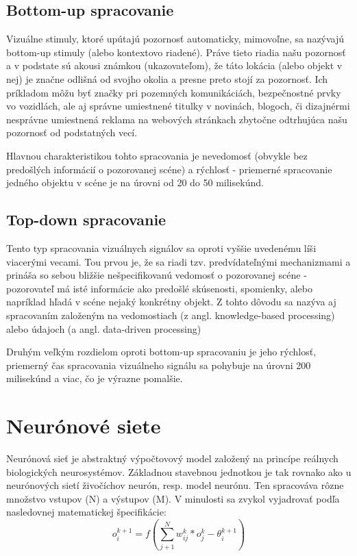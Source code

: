 \subsection{Bottom-up spracovanie}
Vizuálne stimuly, ktoré upútajú pozornosť automaticky, mimovoľne, sa nazývajú bottom-up stimuly (alebo kontextovo riadené). Práve tieto riadia našu pozornosť a v podstate sú akousi známkou (ukazovateľom), že táto lokácia (alebo objekt v nej) je značne odlišná od svojho okolia a presne preto stojí za pozornosť. Ich príkladom môžu byť značky pri pozemných komunikáciách, bezpečnostné prvky vo vozidlách, ale aj správne umiestnené titulky v novinách, blogoch, či dizajnérmi nesprávne umiestnená reklama na webových stránkach zbytočne odtrhujúca našu pozornosť od podstatných vecí. 

Hlavnou charakteristikou tohto spracovania je nevedomosť (obvykle bez predošlých informácií o pozorovanej scéne) a rýchlosť - priemerné spracovanie jedného objektu v scéne je na úrovni od 20 do 50 milisekúnd\cite{itti2001computational}.


\subsection{Top-down spracovanie}
Tento typ spracovania vizuálnych signálov sa oproti vyššie uvedenému líši viacerými vecami. Tou prvou je, že sa riadi tzv. predvídateľnými mechanizmami a prináša so sebou bližšie nešpecifikovanú vedomosť o pozorovanej scéne - pozorovateľ má isté informácie ako predošlé skúsenosti, spomienky, alebo napríklad hľadá v scéne nejaký konkrétny objekt. Z tohto dôvodu sa nazýva aj spracovaním založeným na vedomostiach (z angl. knowledge-based processing\cite{goldstein2008blackwell}) alebo údajoch (a angl. data-driven processing\cite{gregory1974concepts})

Druhým veľkým rozdielom oproti bottom-up spracovaniu je jeho rýchlosť, priemerný čas spracovania vizuálneho signálu sa pohybuje na úrovni 200 milisekúnd\cite{itti2001computational} a viac, čo je výrazne pomalšie.


\section{Neurónové siete}
\label{nn}
	 Neurónová sieť je abstraktný výpočtovový model založený na princípe reálnych biologických neurosystémov. Základnou stavebnou jednotkou je tak rovnako ako u neurónových sietí živočíchov neurón, resp. model neurónu\cite{neuron}. Ten spracováva rôzne množstvo vstupov (N) a výstupov (M). V minulosti sa zvykol vyjadrovať podľa nasledovnej matematickej špecifikácie: 
	\begin{equation}
		o_i ^{k+1} = f\left ( \sum_{j+1}^{N} w_{ij}^{k} * o_j^k - \theta_i^{k+1}  \right )
	\end{equation}
	
